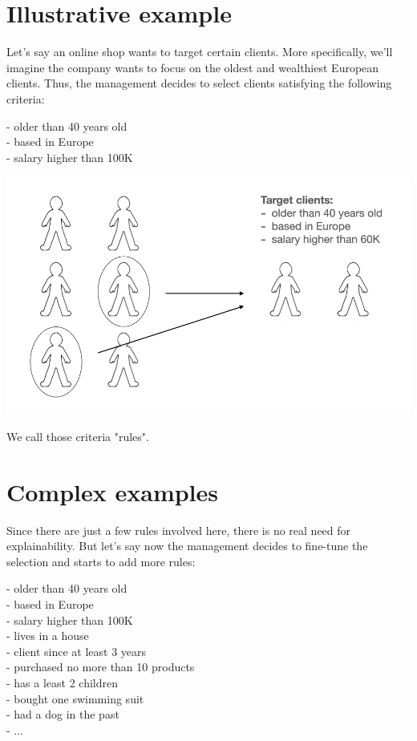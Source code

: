 \section{Illustrative example}

\label{sec:illustrative-example}

Let's say an online shop wants to target certain clients. More specifically, we'll imagine the company wants to focus on the oldest and wealthiest European clients. Thus, the management decides to select clients satisfying the following criteria: 

- older than 40 years old \\
- based in Europe \\
- salary higher than 100K \\

\begin{center}
\includegraphics[scale=0.5]{clients-filter.png}
\end{center}

We call those criteria "rules".

\section{Complex examples}

\label{sec:complex-example}

Since there are just a few rules involved here, there is no real need for explainability. But let's say now the management decides to fine-tune the selection and starts to add more rules:

- older than 40 years old \\
- based in Europe \\
- salary higher than 100K \\
- lives in a house \\
- client since at least 3 years \\
- purchased no more than 10 products \\
- has a least 2 children \\
- bought one swimming suit \\
- had a dog in the past \\
- ...

